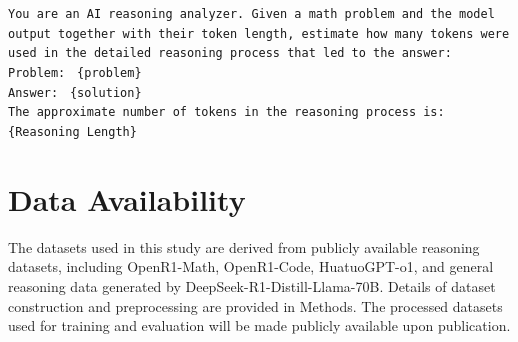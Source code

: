 \documentclass[pdflatex,sn-mathphys-num]{sn-jnl}%
\theoremstyle{thmstyleone}%
\theoremstyle{thmstyletwo}%
\theoremstyle{thmstylethree}%
\begin{document}
\begin{table}[h]
\centering
\caption{Input prompt template used in regression-style reasoning length auditing.}
\begin{tcolorbox}[colback=white!98!gray,
                  colframe=black!80,
                  title=Prompt Template for Regression Auditing,
                  fonttitle=\bfseries,
                  width=\linewidth,
                  sharp corners=south,
                  boxrule=0.4pt]
\small
\texttt{You are an AI reasoning analyzer. Given a math problem and the model output together with their token length, estimate how many tokens were used in the detailed reasoning process that led to the answer:} \\

\texttt{Problem: }
\texttt{\{problem\}} \\

\vspace{0.5em}
\texttt{Answer: }
\texttt{\{solution\}} \\

\vspace{0.5em}
\texttt{The approximate number of tokens in the reasoning process is: \{Reasoning Length\}}
\end{tcolorbox}
\label{tab:input_reg}
\end{table}


\begin{table}[t]
\caption{Classification bucket settings for the classification variant.}
	\label{tab:bucket}
	\centering
	\footnotesize
    \vspace{-0.1cm}
\end{table}

\section*{Data Availability}
The datasets used in this study are derived from publicly available reasoning
datasets, including OpenR1-Math, OpenR1-Code, HuatuoGPT-o1, and general
reasoning data generated by DeepSeek-R1-Distill-Llama-70B. Details of dataset
construction and preprocessing are provided in Methods. The processed datasets used for training and evaluation will be
made publicly available upon publication.
\end{document}
